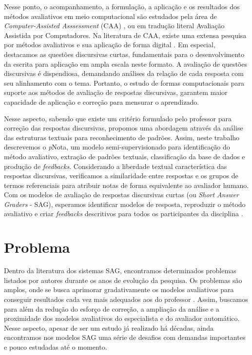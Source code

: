 Nesse ponto, o acompanhamento, a formulação, a aplicação e os resultados dos métodos avaliativos em meio computacional são estudados pela área de \textit{Computer-Assisted Asssessment} (CAA) \cite{bogarin2018}, ou em tradução literal Avaliação Assistida por Computadores. Na literatura de CAA, existe uma extensa pesquisa por métodos avaliativos e sua aplicação de forma digital \cite{perez-marin2009}. Em especial, destacamos as questões discursivas curtas, fundamentais para o desenvolvimento da escrita para aplicação em ampla escala neste formato. A avaliação de questões discursivas é dispendiosa, demandando análises da relação de cada resposta com seu alinhamento com o tema. Portanto, o estudo de formas computacionais para suporte aos métodos de avaliação de respostas discursivas, garantem maior capacidade de aplicação e correção para mensurar o aprendizado.

Nesse aspecto, sabendo que existe um critério formulado pelo professor para correção das respostas discursivas, propomos uma abordagem através da análise das estruturas textuais para reconhecimento de padrões. Assim, neste trabalho descrevemos o \textit{p}Nota, um modelo semi-supervisionado para identificação do método avaliativo, extração de padrões textuais, classificação da base de dados e produção de \textit{feedbacks}. Considerando a liberdade textual característica das respostas discursivas, verificamos a similaridade entre respostas e os grupos de termos referenciais para atribuir notas de forma equivalente ao avaliador humano. Com os modelos de avaliação de respostas discursivas curtas (ou \textit{Short Answer Graders} - SAG), esperamos identificar modelos de resposta, reproduzir o método avaliativo e criar \textit{feedbacks} descritivos para todos os participantes da disciplina \cite{arter2006, spalenza2016a}.

\section{Problema} 
\label{cap1-problema}

Dentro da literatura dos sistemas SAG, encontramos determinados problemas listados por autores durante os anos de evolução da pesquisa. Os problemas são amplos, onde se busca aprimorar gradativamente os modelos avaliativos para conseguir resultados cada vez mais adequados aos do professor \cite{pado2021}. Assim, buscamos para além da redução do esforço de correção, a ampliação da análise e a proximidade dos modelos avaliativos do especialista e do avaliador automático. Nesse aspecto, apesar de ser um estudo já realizado há décadas, ainda encontramos nos modelos SAG uma série de desafios com demandas importantes e pouco estudadas até o momento.


